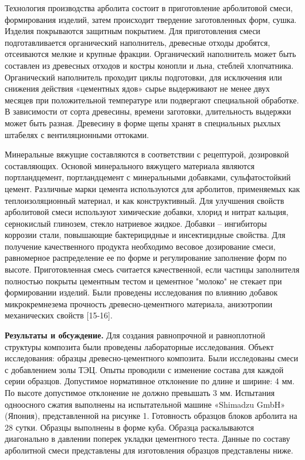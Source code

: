 Технология производства арболита состоит в приготовление арболитовой
смеси, формирования изделий, затем происходит твердение заготовленных
форм, сушка. Изделия покрываются защитным покрытием. Для приготовления
смеси подготавливается органический наполнитель, древесные отходы
дробятся, отсеиваются мелкие и крупные фракции. Органический наполнитель
может быть составлен из древесных отходов и костры конопли и льна,
стеблей хлопчатника. Органический наполнитель проходит циклы подготовки,
для исключения или снижения действия «цементных ядов» сырье выдерживают
не менее двух месяцев при положительной температуре или подвергают
специальной обработке. В зависимости от сорта древесины, времени
заготовки, длительность выдержки может быть разная. Древесину в форме
щепы хранят в специальных рыхлых штабелях с вентиляционными оттоками.

Минеральные вяжущие составляются в соответствии с рецептурой, дозировкой
составляющих. Основой минерального вяжущего материала являются
портландцемент, портландцемент с минеральными добавками, сульфатостойкий
цемент. Различные марки цемента используются для арболитов, применяемых
как теплоизоляционный материал, и как конструктивный. Для улучшения
свойств арболитовой смеси используют химические добавки, хлорид и нитрат
кальция, сернокислый глинозем, стекло натриевое жидкое. Добавки --
ингибиторы коррозии стали, повышающие бактерицидные и инсектицидные
свойства. Для получение качественного продукта необходимо весовое
дозирование смеси, равномерное распределение ее по форме и регулирование
заполнение форм по высоте. Приготовленная смесь считается качественной,
если частицы заполнителя полностью покрыты цементным тестом и цементное
"молоко" не стекает при формировании изделий. Были проведены
исследования по влиянию добавок микрокремнезема прочность
древесно-цементного материала, анизотропии механических свойств
{[}15-16{]}.

{\bfseries Результаты и обсуждение.} Для создания равнопрочной и
равноплотной структуры композита были проведены лабораторные
исследования. Объект исследования: образцы древесно-цементного
композита. Были исследованы смеси с добавлением золы ТЭЦ. Опыты
проводили с изменение состава для каждой серии образцов. Допустимое
нормативное отклонение по длине и ширине: 4 мм. По высоте допустимое
отклонение не должно превышать 3 мм. Испытания одноосного сжатия
выполнены на испытательной машине «Shimadzu GmbH» (Япония),
представленной на рисунке 1. Готовность образцов блоков арболита на 28
сутки. Образцы выполнены в форме куба. Образца раскалываются диагонально
в давлении поперек укладки цементного теста. Данные по составу
арболитной смеси представлены для изготовления образцов представлены
ниже.

